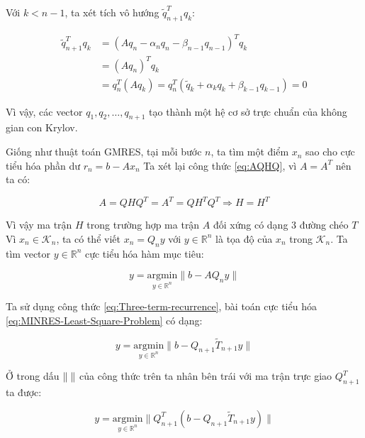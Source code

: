 \documentclass[14pt, a4paper]{article}
\numberwithin{equation}{section}
\numberwithin{algorithm}{section}
\numberwithin{figure}{section}
\numberwithin{dl}{section}
\numberwithin{md}{section}
\numberwithin{bd}{section}
\numberwithin{dn}{section}
\begin{document}
Với $k < n-1$, ta xét tích vô hướng $\tilde{q}_{n+1}^T q_k$:

\begin{equation}
    \begin{aligned}
        \tilde{q}_{n+1}^T q_k &= (A q_n - \alpha_n q_n - \beta_{n-1} q_{n-1})^T q_k \\
        &= (Aq_n)^T q_k \\
        &= q_n^T (Aq_k)=q_n^T (\tilde{q}_k + \alpha_k q_k + \beta_{k-1} q_{k-1})=0
    \end{aligned}
\end{equation}

Vì vậy, các vector $q_1, q_2, \dots, q_{n+1}$ tạo thành một hệ cơ sở trực chuẩn của không gian con Krylov.

Giống như thuật toán GMRES, tại mỗi bước $n$, ta tìm một điểm $x_n$ sao cho cực tiểu hóa phần dư $r_n=b - Ax_n$
Ta xét lại công thức \ref{eq:AQHQ}, vì $A = A^T$ nên ta có:

\begin{equation}
    A = QHQ^T = A^T = QH^TQ^T \Rightarrow H = H^T
\end{equation}

Vì vậy ma trận $H$ trong trường hợp ma trận $A$ đối xứng có dạng 3 đường chéo $T$
Vì $x_n \in \mathcal{K}_n$, ta có thể viết $x_n = Q_n y$ với $y \in \mathbb{R}^n$ là tọa độ của $x_n$ trong $\mathcal{K}_n$. Ta tìm vector $y \in \mathbb{R}^n$ cực tiểu hóa hàm mục tiêu:

\begin{equation} \label{eq:MINRES-Least-Square-Problem}
    y = \underset{y \in \mathbb{R}^n}{\mathrm{argmin}} \lVert b - AQ_n y \rVert
\end{equation}

Ta sử dụng công thức \ref{eq:Three-term-recurrence}, bài toán cực tiểu hóa \ref{eq:MINRES-Least-Square-Problem} có dạng:

\begin{equation}
    y = \underset{y \in \mathbb{R}^n}{\mathrm{argmin}} \lVert b - Q_{n+1} \widetilde{T}_{n+1} y \rVert
\end{equation}

Ở trong dấu $\lVert \thickspace \rVert$ của công thức trên ta nhân bên trái với ma trận trực giao $Q_{n+1}^T$ ta được:

\begin{equation}
    y = \underset{y \in \mathbb{R}^n}{\mathrm{argmin}} \lVert Q_{n+1}^T(b - Q_{n+1} \widetilde{T}_{n+1} y) \rVert
\end{equation}
\end{document}
